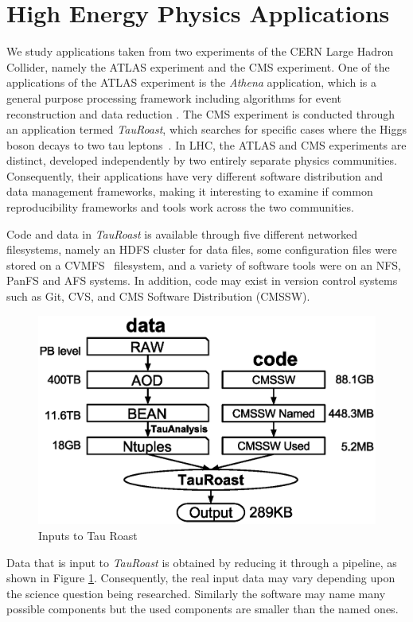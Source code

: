


\section{High Energy Physics Applications}

We study applications taken from two experiments of the CERN Large Hadron Collider, namely the ATLAS experiment and the CMS experiment. 
One of the applications of the ATLAS experiment is the \emph{Athena} application, which is a general purpose processing framework including algorithms
for event reconstruction and data reduction \cite{calafiura2005athena}. The CMS experiment is conducted through an application termed  \emph{TauRoast}, which searches for specific 
cases where the Higgs boson decays to two tau leptons~\cite{chatrchyan2013search}. In LHC, the ATLAS and CMS experiments are distinct, 
developed independently by two entirely separate physics communities. Consequently, their applications  
have very different software distribution and data management frameworks, making it interesting to examine if common reproducibility frameworks and 
tools work across the two communities. 



Code and data in \emph{TauRoast} is available through five different networked filesystems, namely an HDFS cluster for data files, 
some configuration files were stored on a CVMFS~\cite{blomer2011cernvm} filesystem, and a variety of software tools were on an NFS, PanFS and AFS systems.
In addition, code may exist in version control systems such as Git, CVS, and CMS Software Distribution (CMSSW). %
\begin{figure}
\small
\centering
\includegraphics[width=.4\textwidth]{data-code-size.eps}
\caption{Inputs to Tau Roast}
\label{fig:data-code-size}
\end{figure}
Data that is input to \emph{TauRoast} is obtained by reducing it through a pipeline, as shown in Figure \ref{fig:data-code-size}. Consequently, the real input data may 
vary depending upon the science question being researched. Similarly the software may name many possible components but the used components are
smaller than the named ones. 

